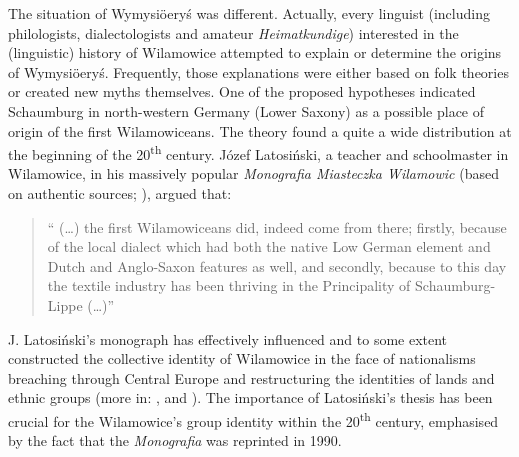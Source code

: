 \documentclass[output=paper]{langscibook}
\begin{document}
The situation of Wymysiöeryś was different. Actually, every linguist (including philologists, dialectologists and amateur \textit{Heimatkundige}) interested in the (linguistic) history of Wilamowice attempted to explain or determine the origins of Wymysiöeryś. Frequently, those explanations were either based on folk theories or created new myths themselves. 
One of the proposed hypotheses indicated Schaumburg in north-western Germany (Lower Saxony) as a possible place of origin of the first Wilamowiceans. The theory found a quite a wide distribution at the beginning of the 20\textsuperscript{th} century. Józef Latosiński, a teacher and schoolmaster in Wilamowice, in his massively popular \textit{Monografia Miasteczka Wilamowic} (based on authentic sources; \citeyear{latosinski_monografia_1909}), argued that: 

\begin{quote}
    “ (\ldots) the first Wilamowiceans did, indeed come from there; firstly, because of the local dialect which had both the native Low German element and Dutch and Anglo-Saxon features as well, and secondly, because to this day the textile industry has been thriving in the Principality of Schaumburg-Lippe (\ldots)”
\end{quote}

J. Latosiński’s monograph has effectively influenced and to some extent constructed the collective identity of Wilamowice in the face of nationalisms breaching through Central Europe and restructuring the identities of lands and ethnic groups (more in: \citealt[23ff]{wicherkiewicz_researching_2016}, and \citealt{chromik_mikro_2019}). The importance of Latosiński’s thesis has been crucial for the Wilamowice’s group identity within the 20\textsuperscript{th} century, emphasised by the fact that the \textit{Monografia} was reprinted in 1990.
\end{document}
